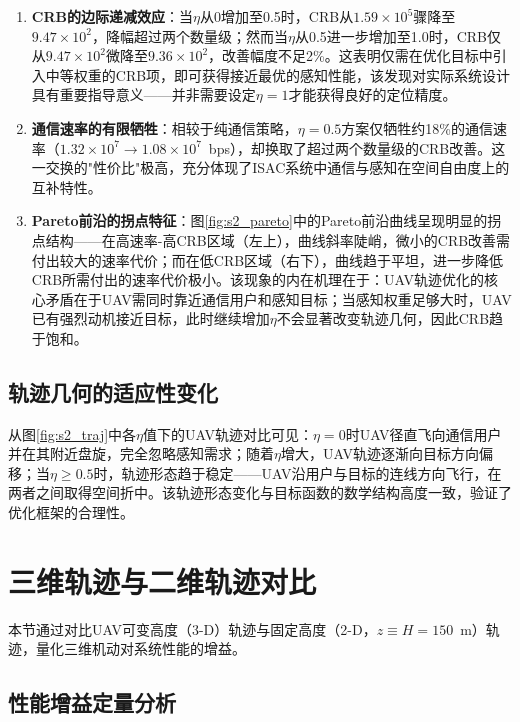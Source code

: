 \begin{enumerate}
\item \textbf{CRB的边际递减效应}：当$\eta$从0增加至0.5时，CRB从$1.59\times10^{5}$骤降至$9.47\times10^{2}$，降幅超过两个数量级；然而当$\eta$从0.5进一步增加至1.0时，CRB仅从$9.47\times10^{2}$微降至$9.36\times10^{2}$，改善幅度不足2\%。这表明仅需在优化目标中引入中等权重的CRB项，即可获得接近最优的感知性能，该发现对实际系统设计具有重要指导意义——并非需要设定$\eta=1$才能获得良好的定位精度。

\item \textbf{通信速率的有限牺牲}：相较于纯通信策略，$\eta=0.5$方案仅牺牲约18\%的通信速率（$1.32\times10^{7}\rightarrow1.08\times10^{7}$~bps），却换取了超过两个数量级的CRB改善。这一交换的"性价比"极高，充分体现了ISAC系统中通信与感知在空间自由度上的互补特性。

\item \textbf{Pareto前沿的拐点特征}：图\ref{fig:s2_pareto}中的Pareto前沿曲线呈现明显的拐点结构——在高速率-高CRB区域（左上），曲线斜率陡峭，微小的CRB改善需付出较大的速率代价；而在低CRB区域（右下），曲线趋于平坦，进一步降低CRB所需付出的速率代价极小。该现象的内在机理在于：UAV轨迹优化的核心矛盾在于UAV需同时靠近通信用户和感知目标；当感知权重足够大时，UAV已有强烈动机接近目标，此时继续增加$\eta$不会显著改变轨迹几何，因此CRB趋于饱和。
\end{enumerate}

\subsection{轨迹几何的适应性变化}

从图\ref{fig:s2_traj}中各$\eta$值下的UAV轨迹对比可见：$\eta=0$时UAV径直飞向通信用户并在其附近盘旋，完全忽略感知需求；随着$\eta$增大，UAV轨迹逐渐向目标方向偏移；当$\eta\geq0.5$时，轨迹形态趋于稳定——UAV沿用户与目标的连线方向飞行，在两者之间取得空间折中。该轨迹形态变化与目标函数的数学结构高度一致，验证了优化框架的合理性。

\section{三维轨迹与二维轨迹对比}

本节通过对比UAV可变高度（3-D）轨迹与固定高度（2-D，$z\equiv H=150$~m）轨迹，量化三维机动对系统性能的增益。

\subsection{性能增益定量分析}

